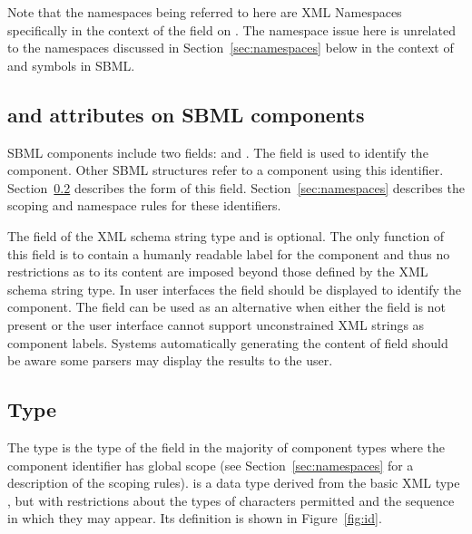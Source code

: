 \documentclass[10pt]{cekarticle}
\newcommand{\vref}[1]{\ref{#1}}
\begin{document}
Note that the namespaces being referred to here are XML Namespaces
specifically in the context of the  field on
.  The namespace issue here is unrelated to the namespaces
discussed in Section~\ref{sec:namespaces} below in the context of
 and symbols in SBML.

\subsection{ and  attributes on SBML components}

\label{sec:idnameattribs}

SBML components include two fields:  and .
The  field is used to identify the component.  Other
SBML structures refer to a component using this identifier.
Section~\ref{sec:id} describes the form of this field.
Section~\ref{sec:namespaces} describes the scoping and namespace
rules for these identifiers.

The  field of the XML schema string type and is optional. The
only function of this field is to contain a humanly readable label
for the component and thus no restrictions as to its
content are imposed beyond those defined by the XML schema string type.  In user interfaces the  field should be
displayed to identify the component.  The  field can be
used as an alternative when either the  field is not
present or the user interface cannot support unconstrained XML
strings as component labels.  Systems automatically generating the
content of  field should be aware some parsers may
display the results to the user.

\subsection{Type }
\label{sec:id}

The type  is the type of the  field in the
majority of component types where the component identifier has
global scope (see Section~\ref{sec:namespaces} for a description
of the scoping rules).  is a data type derived from the
basic XML type , but with restrictions about the
types of characters permitted and the sequence in which they may
appear. Its definition is shown in Figure~\vref{fig:id}.
\end{document}
